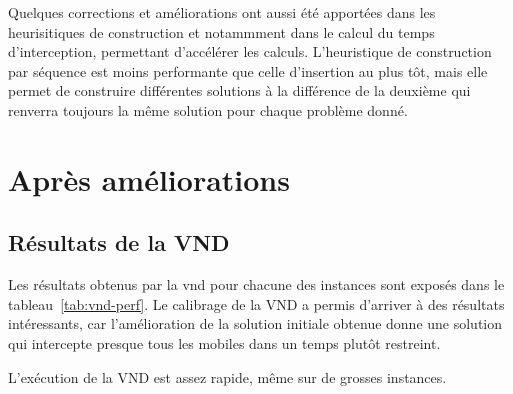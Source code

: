     	Quelques corrections et améliorations ont aussi été apportées dans les heurisitiques de construction et notammment dans le calcul du temps d'interception, permettant d'accélérer les calculs. L'heuristique de construction par séquence est moins performante que celle d'insertion au plus tôt, mais elle permet de construire différentes solutions à la différence de la deuxième qui renverra toujours la même solution pour chaque problème donné.
    	
    \section{Après améliorations}
    	\subsection{Résultats de la VND}
		
		Les résultats obtenus par la \acrlong{vnd} pour chacune des instances sont exposés dans le tableau~\ref{tab:vnd-perf}. Le calibrage de la VND a permis d'arriver à des résultats intéressants, car l'amélioration de la solution initiale obtenue donne une solution qui intercepte presque tous les mobiles dans un temps plutôt restreint. 
		
		L'exécution de la VND est assez rapide, même sur de grosses instances.
		

